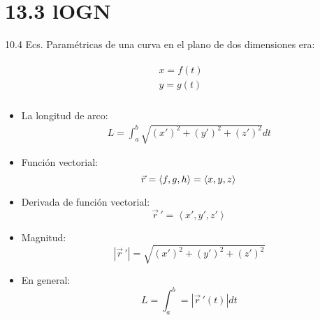 \section{13.3 lOGN}
10.4 Ecs. Paramétricas de una curva en el plano de dos dimensiones era:
\begin{center}
   \begin{align*}
       \begin{matrix}
        x=f(t) \\ 
        y = g(t) \\ 
       \end{matrix}
   \end{align*}
\end{center}
\begin{itemize}
    \item La longitud de arco:
        \begin{align*}
            L = \int_{a}^{b} \sqrt{(x')^2+(y')^2+(z')^2} dt
        \end{align*}
    
    \item Función vectorial:
        \[
          \vec{r} = \left\langle f,g,h \right\rangle = \left\langle x,y,z \right\rangle \\ 
        \]
    
    
    \item Derivada de función vectorial:
        \[
          \vec{r}\,'= \left\langle x',y',z' \right\rangle 
        \]
    
    \item Magnitud: 
        \[
          \left| \vec{r}\,' \right| = \sqrt{(x')^2+(y')^2+(z')^2}
        \]
    
    \item En general: 
        \[
          L = \int_{a}^{b} = \left| \vec{r}\,'(t) \right|dt  
        \]
\end{itemize}



